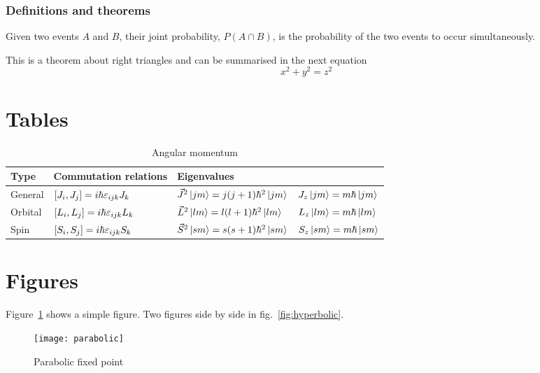 \subsubsection{Definitions and theorems}

\begin{def*}
Given two events $A$ and $B$, their joint probability, \(P(A \cap B)\), is the probability of the two events to occur simultaneously.
\end{def*}

\begin{theorem*}
    	This is a theorem about right triangles and can be summarised in the next equation 
\[
	x^2 + y^2 = z^2
\]
\end{theorem*}

\section{Tables}

\begin{table}[ht]
\centering
\caption{Angular momentum}
\label{tab:my-label}
\begin{tabular}{llll}
\toprule
Type & Commutation relations & Eigenvalues & \\
\midrule
General & \(\comm{J_i}{J_j} = i \hbar \varepsilon_{ijk} J_k\)  & \(\vec{J}^2 \ket{jm} = j(j+1) \hbar^2 \ket{jm}\) & \(J_z \ket{jm} = m \hbar \ket{jm}\) \\ 
Orbital  & \(\comm{L_i}{L_j} = i \hbar \varepsilon_{ijk} L_k\)  & \(\vec{L}^2 \ket{lm} = l(l+1) \hbar^2 \ket{lm}\) & \(L_z \ket{lm} = m \hbar \ket{lm}\) \\
Spin  & \(\comm{S_i}{S_j} = i \hbar \varepsilon_{ijk} S_k\)  & \(\vec{S}^2 \ket{sm} = s(s+1) \hbar^2 \ket{sm}\) & \(S_z \ket{sm} = m \hbar \ket{sm}\) \\
\bottomrule
\end{tabular}
\end{table}

\section{Figures}

Figure~\ref{fig:parabolic} shows a simple figure. Two figures side by side in fig.~\ref{fig:hyperbolic}.

\begin{figure}[H]
  \centering
  \texttt{[image: parabolic]}
  \caption{Parabolic fixed point}
\label{fig:parabolic}
\end{figure}

